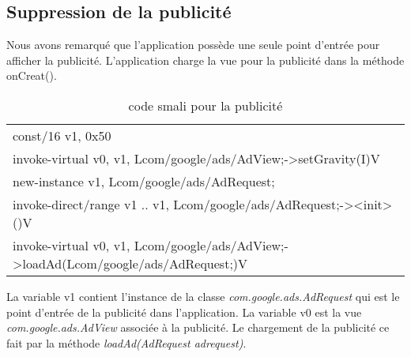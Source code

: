 
\subsection{Suppression de la publicité}
Nous avons remarqué que l'application possède une seule point d'entrée pour afficher la publicité.
L'application charge la vue pour la publicité dans la méthode onCreat().
\begin{figure}[hp]
	      \begin{center}
	      \end{center}
\end{figure}

\begin{table}[here]
    \begin{center}
	\begin{tabular}{|l|}
	\hline
	const/16 v1, 0x50 \\[0.2cm]
	
	invoke-virtual {v0, v1}, Lcom/google/ads/AdView;->setGravity(I)V \\[0.2cm]

	new-instance v1, Lcom/google/ads/AdRequest; \\[0.2cm]

	invoke-direct/range {v1 .. v1}, Lcom/google/ads/AdRequest;-><init>()V \\[0.2cm]

	invoke-virtual {v0, v1}, Lcom/google/ads/AdView;->loadAd(Lcom/google/ads/AdRequest;)V \\
	\hline
	\end{tabular}
    \end{center}
    \caption{\label{}code smali pour la publicité}
\end{table} 
La variable v1 contient l'instance de la classe \textit{com.google.ads.AdRequest} qui est le point d'entrée de la publicité dans l'application.
La variable v0 est la vue \textit{com.google.ads.AdView} associée à la publicité. Le chargement de la publicité ce fait par la méthode \textit{loadAd(AdRequest adrequest)}.
